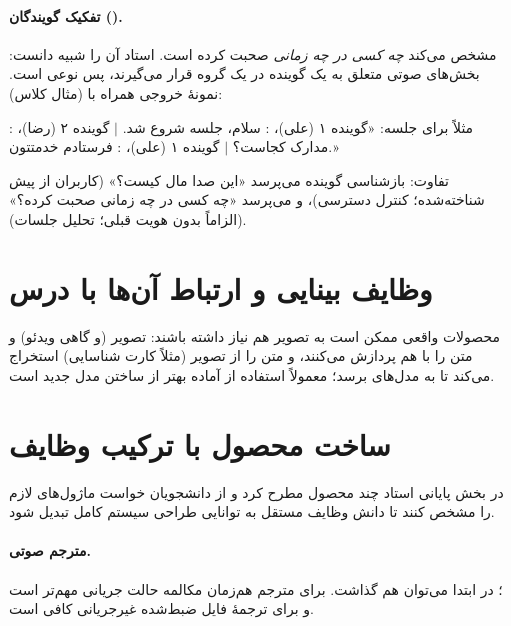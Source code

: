 \paragraph{تفکیک گویندگان ().} مشخص می‌کند \emph{چه کسی در چه زمانی} صحبت کرده است. استاد آن را شبیه  دانست: بخش‌های صوتی متعلق به یک گوینده در یک گروه قرار می‌گیرند، پس نوعی  است. نمونهٔ خروجی همراه با  (مثال کلاس):

مثلاً برای جلسه: «گوینده ۱ (علی)، : سلام، جلسه شروع شد. $\mid$ گوینده ۲ (رضا)، : مدارک کجاست؟ $\mid$ گوینده ۱ (علی)، : فرستادم خدمتتون.»

تفاوت: بازشناسی گوینده می‌پرسد «این صدا مال کیست؟» (کاربران از پیش شناخته‌شده؛ کنترل دسترسی)، و  می‌پرسد «چه کسی در چه زمانی صحبت کرده؟» (الزاماً بدون هویت قبلی؛ تحلیل جلسات).

\section{وظایف بینایی و ارتباط آن‌ها با درس}
محصولات واقعی ممکن است به تصویر هم نیاز داشته باشند:  تصویر (و گاهی ویدئو) و متن را با هم پردازش می‌کنند، و  متن را از تصویر (مثلاً کارت شناسایی) استخراج می‌کند تا به مدل‌های  برسد؛ معمولاً استفاده از  آماده بهتر از ساختن مدل جدید است.

\section{ساخت محصول با ترکیب وظایف}
در بخش پایانی استاد چند محصول مطرح کرد و از دانشجویان خواست ماژول‌های لازم را مشخص کنند تا دانش وظایف مستقل به توانایی طراحی سیستم کامل تبدیل شود.

\paragraph{مترجم صوتی.} ؛ در ابتدا می‌توان  هم گذاشت. برای مترجم هم‌زمان مکالمه حالت جریانی مهم‌تر است و برای ترجمهٔ فایل ضبط‌شده غیرجریانی کافی است.

